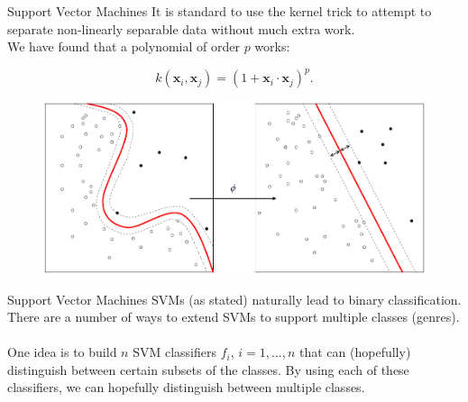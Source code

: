 \documentclass[xcolor=dvipsnames,t]{beamer} %
\begin{document}
\begin{frame}{Support Vector Machines}
It is standard to use the kernel trick to attempt to separate non-linearly separable data without much extra work.\\

We have found that a polynomial of order $p$ works:

\[ k(\mathbf{x}_i,\mathbf{x}_j) = \left(1 + \mathbf{x}_i\cdot\mathbf{x}_j\right)^p. \] 

\begin{figure}[b]
   \centering
   \includegraphics[width=\textwidth]{figures/Kernel_Machine_public.png}
\end{figure}
\end{frame}

\begin{frame}{Support Vector Machines}
   SVMs (as stated) naturally lead to binary classification.  There are a number of ways to extend SVMs to support multiple classes (genres).\\

   ~\\
   One idea is to build $n$ SVM classifiers $f_i$, $i=1,...,n$ that can (hopefully) distinguish between certain subsets of the classes.  By using each of these classifiers, we can hopefully distinguish between multiple classes.\\
   
\end{frame}
\end{document}

